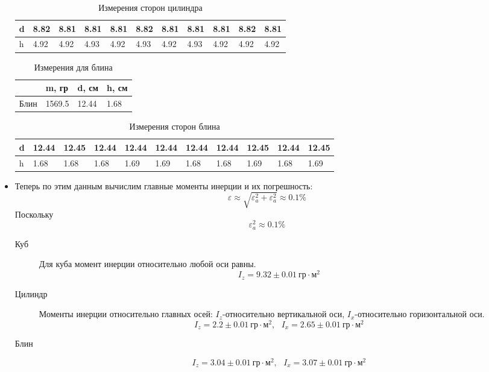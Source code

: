 \documentclass[a4paper, 10pt]{article}%
\begin{document}
\begin{itemize}
\begin{table}[!h]
    \centering
    \begin{tabular}{|l|l|l||l|l|l||l|l|l||l||l|} \hline
        d & 8.82 & 8.81 & 8.81 & 8.81 & 8.82 & 8.81 & 8.81 & 8.81 & 8.82 & 8.81 \\ \hline
        h & 4.92 & 4.92 & 4.93 & 4.92 & 4.93 & 4.92 & 4.93 & 4.92 & 4.92 & 4.92 \\ \hline
    \end{tabular}
    \caption{Измерения сторон цилиндра}
\end{table}
\clearpage

\begin{table}[!ht]
    \centering
    \begin{tabular}{|l|l|l|l|} \hline
         & m, гр & d, см & h, см  \\ \hline
        Блин & 1569.5 & 12.44 & 1.68  \\ \hline
    \end{tabular}
    \caption{Измерения для блина}
\end{table}

\begin{table}[!ht]
    \centering
    \begin{tabular}{|l|l|l||l|l|l||l|l|l||l||l|} \hline
        d & 12.44 & 12.45 & 12.44 & 12.44 & 12.44 & 12.44 & 12.44 & 12.45 & 12.44 & 12.45 \\ \hline
        h & 1.68 & 1.68 & 1.68 & 1.69 & 1.69 & 1.68 & 1.68 & 1.69 & 1.68 & 1.69 \\ \hline
    \end{tabular}
    \caption{Измерения сторон блина}
\end{table}
\item Теперь по этим данным вычислим главные моменты инерции и их погрешность:
$$\varepsilon \approx \sqrt{\varepsilon^2_{a}+\varepsilon^2_{a}}\approx 0.1 \% $$
Поскольку $$\varepsilon^2_{a}\approx 0.1\%$$
\begin{description}
    \item[Куб]Для куба момент инерции относительно любой оси равны.
$$I_{z}= 9.32 \pm 0.01 \ \text{гр}\cdot \text{м}^2$$
    \item[Цилиндр]Моменты инерции относительно главных осей:
     $I_{z}$-относительно вертикальной оси, $I_{x}$-относительно горизонтальной оси.
$$I_{z}= 2.2 \pm 0.01 \ \text{гр}\cdot \text{м}^2, \ \ \ I_{x}= 2.65 \pm 0.01 \ \text{гр}\cdot \text{м}^2$$
\item[Блин]
$$I_{z}= 3.04 \pm 0.01 \ \text{гр}\cdot \text{м}^2, \ \ \ I_{x}= 3.07 \pm 0.01 \ \text{гр}\cdot \text{м}^2$$


\end{description}
\end{itemize}
\end{document}
